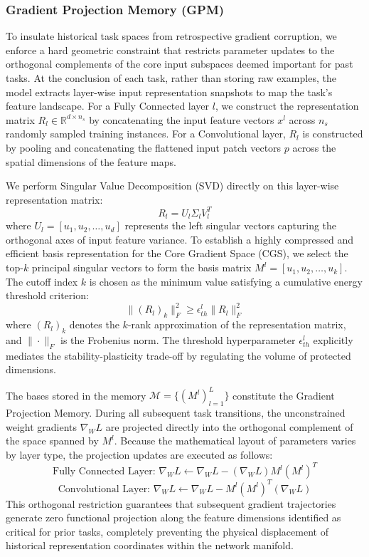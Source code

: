 \documentclass[10pt,a4paper]{article}
\begin{document}
	\subsubsection{Gradient Projection Memory (GPM)}
	To insulate historical task spaces from retrospective gradient corruption, we enforce a hard geometric constraint that restricts parameter updates to the orthogonal complements of the core input subspaces deemed important for past tasks. At the conclusion of each task, rather than storing raw examples, the model extracts layer-wise input representation snapshots to map the task's feature landscape. For a Fully Connected layer $l$, we construct the representation matrix $R_l \in \mathbb{R}^{d \times n_s}$ by concatenating the input feature vectors $x^l$ across $n_s$ randomly sampled training instances. For a Convolutional layer, $R_l$ is constructed by pooling and concatenating the flattened input patch vectors $p$ across the spatial dimensions of the feature maps.
	
	We perform Singular Value Decomposition (SVD) directly on this layer-wise representation matrix:
	\begin{equation}
		R_l = U_l \Sigma_l V_l^T
	\end{equation}
	where $U_l = [u_1, u_2, \dots, u_d]$ represents the left singular vectors capturing the orthogonal axes of input feature variance. To establish a highly compressed and efficient basis representation for the Core Gradient Space (CGS), we select the top-$k$ principal singular vectors to form the basis matrix $M^l = [u_1, u_2, \dots, u_k]$. The cutoff index $k$ is chosen as the minimum value satisfying a cumulative energy threshold criterion:
	\begin{equation}
		\|(R_l)_k\|_F^2 \ge \epsilon_{th}^l \|R_l\|_F^2
	\end{equation}
	where $(R_l)_k$ denotes the $k$-rank approximation of the representation matrix, and $\| \cdot \|_F$ is the Frobenius norm. The threshold hyperparameter $\epsilon_{th}^l$ explicitly mediates the stability-plasticity trade-off by regulating the volume of protected dimensions.
	
	The bases stored in the memory $\mathcal{M} = \{(M^l)_{l=1}^L\}$ constitute the Gradient Projection Memory. During all subsequent task transitions, the unconstrained weight gradients $\nabla_{W} L$ are projected directly into the orthogonal complement of the space spanned by $M^l$. Because the mathematical layout of parameters varies by layer type, the projection updates are executed as follows:
	\begin{equation}
		\text{Fully Connected Layer: } \nabla_{W} L \leftarrow \nabla_{W} L - (\nabla_{W} L) M^l (M^l)^T
	\end{equation}
	\begin{equation}
		\text{Convolutional Layer: } \nabla_{W} L \leftarrow \nabla_{W} L - M^l (M^l)^T (\nabla_{W} L)
	\end{equation}
	This orthogonal restriction guarantees that subsequent gradient trajectories generate zero functional projection along the feature dimensions identified as critical for prior tasks, completely preventing the physical displacement of historical representation coordinates within the network manifold.
	
\end{document}
